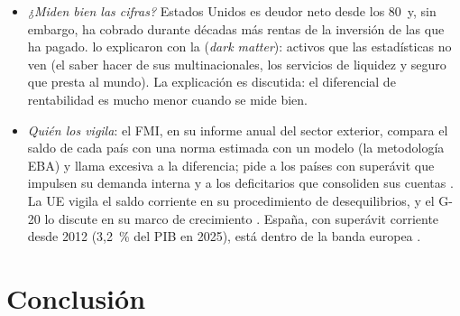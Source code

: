 \documentclass[11pt]{article}
\begin{document}
\begin{itemize}
\item \emph{¿Miden bien las cifras?} Estados Unidos es deudor neto desde los 80~y, sin embargo, ha cobrado durante décadas más rentas de la inversión de las que ha pagado. \textcite{HausmannSturzenegger2007} lo explicaron con la  (\emph{dark matter}): activos que las estadísticas no ven (el saber hacer de sus multinacionales, los servicios de liquidez y seguro que presta al mundo). La explicación es discutida: el diferencial de rentabilidad es mucho menor cuando se mide bien\nocite{CurcuruDvorakWarnock2008}.
\item \emph{Quién los vigila}: el FMI, en su informe anual del sector exterior, compara el saldo de cada país con una norma estimada con un modelo (la metodología EBA) y llama excesiva a la diferencia\nocite{FMI2013EBA}; pide a los países con superávit que impulsen su demanda interna y a los deficitarios que consoliden sus cuentas\nocite{FMI2026ESR} . La UE vigila el saldo corriente en su procedimiento de desequilibrios\nocite{CE2025AMR2026}, y el G-20 lo discute en su marco de crecimiento . España, con superávit corriente desde 2012 (3,2~\% del PIB en 2025), está dentro de la banda europea\nocite{BdE2026BE17} .
\end{itemize}

\section*{Conclusión}
\end{document}
